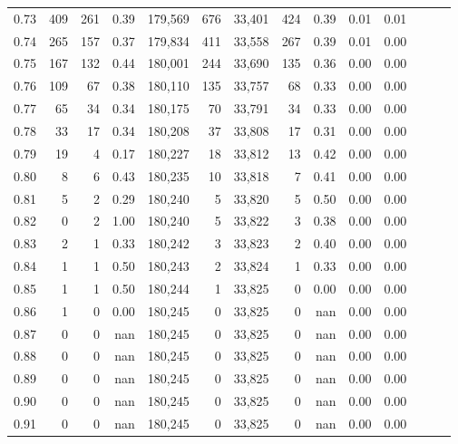 \begin{tabular}{rrrrrrrrrrrrrr}
0.73 &    409 &    261 &  0.39 &  179,569 &      676 &  33,401 &     424 &  0.39 &  0.01 &      0.01 \\
0.74 &    265 &    157 &  0.37 &  179,834 &      411 &  33,558 &     267 &  0.39 &  0.01 &      0.00 \\
0.75 &    167 &    132 &  0.44 &  180,001 &      244 &  33,690 &     135 &  0.36 &  0.00 &      0.00 \\
0.76 &    109 &     67 &  0.38 &  180,110 &      135 &  33,757 &      68 &  0.33 &  0.00 &      0.00 \\
0.77 &     65 &     34 &  0.34 &  180,175 &       70 &  33,791 &      34 &  0.33 &  0.00 &      0.00 \\
0.78 &     33 &     17 &  0.34 &  180,208 &       37 &  33,808 &      17 &  0.31 &  0.00 &      0.00 \\
0.79 &     19 &      4 &  0.17 &  180,227 &       18 &  33,812 &      13 &  0.42 &  0.00 &      0.00 \\
0.80 &      8 &      6 &  0.43 &  180,235 &       10 &  33,818 &       7 &  0.41 &  0.00 &      0.00 \\
0.81 &      5 &      2 &  0.29 &  180,240 &        5 &  33,820 &       5 &  0.50 &  0.00 &      0.00 \\
0.82 &      0 &      2 &  1.00 &  180,240 &        5 &  33,822 &       3 &  0.38 &  0.00 &      0.00 \\
0.83 &      2 &      1 &  0.33 &  180,242 &        3 &  33,823 &       2 &  0.40 &  0.00 &      0.00 \\
0.84 &      1 &      1 &  0.50 &  180,243 &        2 &  33,824 &       1 &  0.33 &  0.00 &      0.00 \\
0.85 &      1 &      1 &  0.50 &  180,244 &        1 &  33,825 &       0 &  0.00 &  0.00 &      0.00 \\
0.86 &      1 &      0 &  0.00 &  180,245 &        0 &  33,825 &       0 &   nan &  0.00 &      0.00 \\
0.87 &      0 &      0 &   nan &  180,245 &        0 &  33,825 &       0 &   nan &  0.00 &      0.00 \\
0.88 &      0 &      0 &   nan &  180,245 &        0 &  33,825 &       0 &   nan &  0.00 &      0.00 \\
0.89 &      0 &      0 &   nan &  180,245 &        0 &  33,825 &       0 &   nan &  0.00 &      0.00 \\
0.90 &      0 &      0 &   nan &  180,245 &        0 &  33,825 &       0 &   nan &  0.00 &      0.00 \\
0.91 &      0 &      0 &   nan &  180,245 &        0 &  33,825 &       0 &   nan &  0.00 &      0.00 \\

\end{tabular}
